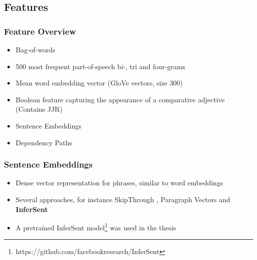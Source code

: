 \documentclass[11pt,aspectratio=169,usenames,dvipsnames]{beamer}
\begin{document}
    \subsection{Features}
    \frame{\subsectionpage}
    
    
    \begin{frame}[t]
        \frametitle{Feature Overview}
        \begin{itemize}
            \item Bag-of-words
            \item 500 most frequent part-of-speech bi-, tri and four-grams
            \item Mean word embedding vector (GloVe vectors, size 300)
            \item Boolean feature capturing the appearance of a comparative adjective (Contains JJR)
            \item Sentence Embeddings
            \item Dependency Paths
        \end{itemize}
      
    \end{frame}
    
    \begin{frame}[t]
        \frametitle{Sentence Embeddings}
        \begin{itemize}
            \item Dense vector representation for phrases, similar to word embeddings\pause
            \item Several approaches, for instance SkipThrough \cite{NIPS2015_5950}, Paragraph Vectors \cite{Le:2014aa} and \textbf{InferSent} \cite{Conneau:2017aa}
            \item A pretrained InferSent model\footnote{https://github.com/facebookresearch/InferSent} was used in the thesis
        \end{itemize}


    \end{frame}
\end{document}
